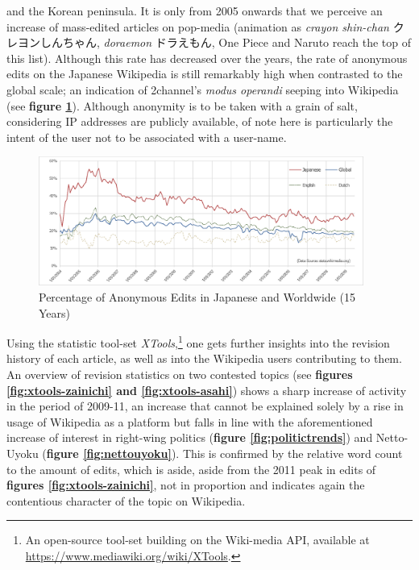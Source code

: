 \documentclass[10pt,british,A4paper,,openany]{memoir}
\begin{document}
and the Korean peninsula. It is only from 2005 onwards that we perceive
an increase of mass-edited articles on pop-media (animation as
\emph{crayon shin-chan} クレヨンしんちゃん, \emph{doraemon} ドラえもん,
One Piece and Naruto reach the top of this list). Although this rate has
decreased over the years, the rate of anonymous edits on the Japanese
Wikipedia is still remarkably high when contrasted to the global scale;
an indication of 2channel's \emph{modus operandi} seeping into Wikipedia
(see \textbf{figure \ref{fig:anon-wiki}}). Although anonymity is to be
taken with a grain of salt, considering IP addresses are publicly
available, of note here is particularly the intent of the user not to be
associated with a user-name.

\begin{figure}[!htb]
 \centering
 \includegraphics[width=0.95\textwidth,trim=4 4 4 4,clip]{images/anon-wiki.eps}
 \centering\caption{Percentage of Anonymous Edits in Japanese and Worldwide (15 Years)}\label{fig:anon-wiki}
\end{figure}

Using the statistic tool-set \emph{XTools},\footnote{An open-source
  tool-set building on the Wiki-media API, available at
  \url{https://www.mediawiki.org/wiki/XTools}.} one gets further
insights into the revision history of each article, as well as into the
Wikipedia users contributing to them. An overview of revision statistics
on two contested topics (see \textbf{figures \ref{fig:xtools-zainichi}
and \ref{fig:xtools-asahi}}) shows a sharp increase of activity in the
period of 2009-11, an increase that cannot be explained solely by a rise
in usage of Wikipedia as a platform but falls in line with the
aforementioned increase of interest in right-wing politics
(\textbf{figure \ref{fig:politictrends}}) and Netto-Uyoku
(\textbf{figure \ref{fig:nettouyoku}}). This is confirmed by the
relative word count to the amount of edits, which is aside, aside from
the 2011 peak in edits of \textbf{figures \ref{fig:xtools-zainichi}},
not in proportion and indicates again the contentious character of the
topic on Wikipedia.
\end{document}
